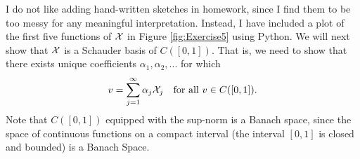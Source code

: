 \begin{solution}

    I do not like adding hand-written sketches in homework, since I find them to be too messy for any meaningful interpretation. Instead, I have included a plot of the first five functions of $\mathcal{X}$ in Figure \ref{fig:Exercise5} using Python. We will next show that $\mathcal{X}$ is a Schauder basis of $C([0, 1])$. That is, we need to show that there exists unique coefficients $\alpha_1, \alpha_2, ...$ for which
    \[v = \sum_{j = 1}^\infty \alpha_j \mathcal{X}_j \quad \text{for all } v \in C([0, 1]).\]
    Note that $C([0, 1])$ equipped with the sup-norm is a Banach space, since the space of continuous functions on a compact interval (the interval $[0, 1]$ is closed and bounded) is a Banach Space. \par
    

\end{solution}
